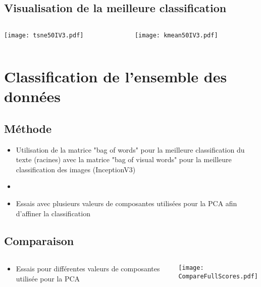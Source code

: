 \documentclass[8pt,aspectratio=169,hyperref={unicode=true}]{beamer}
\begin{document}
\subsection{Visualisation de la meilleure classification}
\begin{frame}{\insertsubsection}
    \begin{columns}
        \begin{column}{.5\textwidth}
            \texttt{[image: tsne50IV3.pdf]}
        \end{column}
        \begin{column}{.5\textwidth}
            \texttt{[image: kmean50IV3.pdf]}
        \end{column}
    \end{columns}
\end{frame}


\section{Classification de l'ensemble des données}

\subsection{Méthode}
\begin{frame}{\insertsubsection}
    \begin{itemize}
        \item Utilisation de la matrice "bag of words" pour la meilleure classification du texte (racines) avec la matrice "bag of visual words" pour la meilleure classification des images (InceptionV3)
        \item[]
        \item Essais avec plusieurs valeurs de composantes utilisées pour la PCA afin d'affiner la classification
    \end{itemize}
\end{frame}

\subsection{Comparaison}
\begin{frame}{\insertsubsection}
    \begin{columns}
        \begin{column}{.4\textwidth}
            \begin{itemize}
                \item Essais pour différentes valeurs de composantes utilisée pour la PCA
            \end{itemize}
        \end{column}
        \begin{column}{.6\textwidth}
            \texttt{[image: CompareFullScores.pdf]}
        \end{column}
    \end{columns}
\end{frame}
\end{document}
